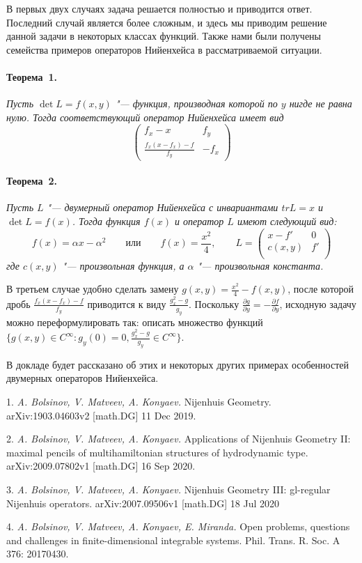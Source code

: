 В первых двух случаях задача решается полностью и приводится ответ.
Последний случай является более сложным, и здесь мы приводим решение данной задачи в некоторых классах функций.
Также нами были получены семейства примеров операторов Нийенхейса в рассматриваемой ситуации.

\paragraph{Теорема~1.}
{\it
Пусть $\det L = f(x,y)$ "--- функция, производная которой по $y$ нигде не равна нулю. Тогда соответствующий оператор Нийенхейса имеет вид
\begin{equation*}
\begin{pmatrix}
f_x - x & f_y \\
\frac{f_x(x - f_x) - f}{f_y} & -f_x
\end{pmatrix}
\end{equation*}
}

\paragraph{Теорема~2.}
{\it
Пусть $L$ "--- двумерный оператор Нийенхейса с инвариантами $tr L = x$ и $\det L = f(x)$. Тогда функция $f(x)$ и оператор $L$ имеют следующий вид:
$$
f(x) = \alpha x - \alpha^2
\qquad
\text{или}
\qquad
f(x) = \frac{x^2}{4},
\qquad
L =
\begin{pmatrix}
x - f' & 0 \\
c(x,y) & f' \\
\end{pmatrix}
$$
где $c(x,y)$ "--- произвольная функция, а $\alpha$ "--- произвольная константа.
}

В третьем случае удобно сделать замену $g(x,y) = \frac{x^2}{4} - f(x,y)$, после которой дробь $\frac{f_x(x - f_x) - f}{f_y}$ приводится
к виду $\frac{g^2_x - g}{g_y}$. Поскольку $\frac{\partial g}{\partial y} = - \frac{\partial f}{\partial y}$, исходную задачу можно переформулировать так:
описать множество функций $\lbrace g(x,y) \in C^{\infty} : g_y(0) = 0, \frac{g^2_x - g}{g_y} \in C^{\infty} \rbrace$.

В докладе будет рассказано об этих и некоторых других примерах особенностей двумерных операторов Нийенхейса.

\litlist


1. {\it A. Bolsinov, V. Matveev, A. Konyaev.} Nijenhuis Geometry. arXiv:1903.04603v2 [math.DG] 11 Dec 2019.

2. {\it A. Bolsinov, V. Matveev, A. Konyaev.} Applications of Nijenhuis Geometry II: maximal pencils of multihamiltonian structures of hydrodynamic type. arXiv:2009.07802v1 [math.DG] 16 Sep 2020.

3. {\it A. Bolsinov, V. Matveev, A. Konyaev.} Nijenhuis Geometry III: gl-regular Nijenhuis operators. arXiv:2007.09506v1 [math.DG] 18 Jul 2020

4. {\it A. Bolsinov, V. Matveev, A. Konyaev, E. Miranda.} Open problems, questions and challenges in finite-dimensional integrable systems. Phil. Trans. R. Soc. A 376: 20170430.
